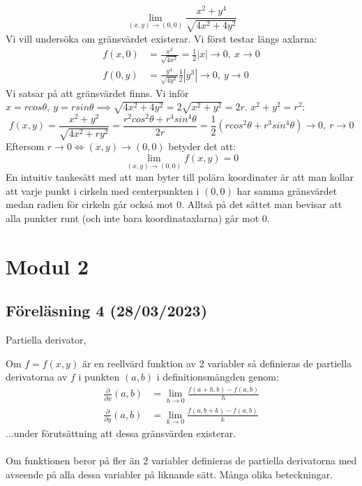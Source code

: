 \documentclass{report}
\begin{document}
\pagebreak
{}
{
\begin{equation*}
\lim_{(x,y) \to (0,0)} \frac{x^2+y^4}{ \sqrt{4x^2+4y^2}  } 
\end{equation*}
Vi vill undersöka om gränsvärdet existerar. Vi först testar längs axlarna:
\begin{align*}
	f(x,0) &= \frac{x^2}{ \sqrt{4x^2} } = \frac{1}{2} |x| \to 0, \: x \to 0\\
	f(0,y) &= \frac{y^4}{ \sqrt{4y^2} }   \frac{1}{2} |y^3| \to 0, \: y \to 0
\end{align*}
Vi satsar på att gränsvärdet finns. Vi inför $ x = rcos\theta, \: y = rsin\theta \implies \sqrt{4x^2+4y^2} = 2 \sqrt{x^2+y^2} = 2r$. $ x^2+y^2 = r^2 $:
\begin{equation*}
	f(x,y) = \frac{x^2+y^2}{ \sqrt{4x^2+ry^2} } = \frac{r^2cos^2\theta + r^4sin^4\theta}{2r} = \frac{1}{2} ( rcos^2\theta + r^3sin^4\theta ) \to 0, \: r \to 0 
\end{equation*}
Eftersom $ r \to 0 \iff (x,y) \to (0,0) $ betyder det att:
\begin{equation*}
\lim_{(x,y) \to (0,0)} f(x,y) = 0
\end{equation*}
En intuitiv tankesätt med att man byter till polära koordinater är att man kollar att varje punkt i cirkeln med centerpunkten i $ (0,0) $ har samma gränsvärdet medan radien för cirkeln går också mot 0. Alltså på det sättet man bevisar att alla punkter runt (och inte bara koordinataxlarna) går mot 0.
}

\pagebreak
\chapter{Modul 2}
\section{Föreläsning 4 (28/03/2023)}
Partiella derivator,

{
Om $ f = f(x,y) $ är en reellvärd funktion av 2 variabler så definieras de partiella derivatorna av $ f $ i punkten $ (a,b) $ i definitionsmängden genom:
\begin{align*}
	\frac{\partial}{\partial x}(a,b) &= \lim_{h \to 0} \frac{f(a+h,b)-f(a,b)}{h}\\
\frac{\partial}{\partial y}(a,b) &= \lim_{k \to 0} \frac{f(a,b+k)-f(a,b)}{k} 
\end{align*}
...under förutsättning att dessa gränsvärden existerar.\\\\

Om funktionen beror på fler än 2 variabler definieras de partiella derivatorna med avseende på alla dessa variabler på liknande sätt. Många olika beteckningar. 
}
\end{document}
